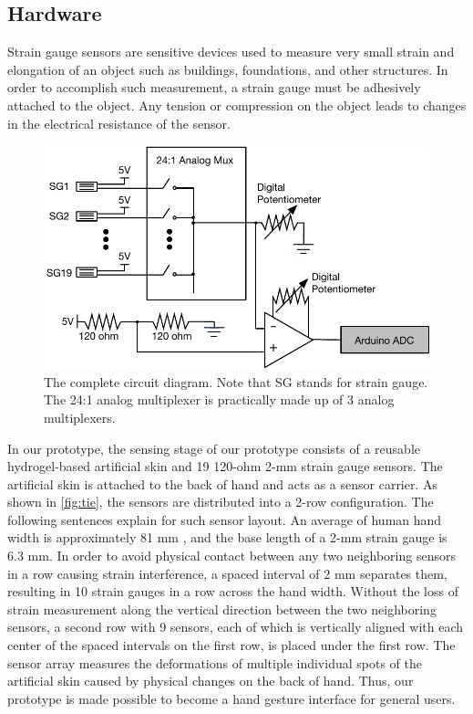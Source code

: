 \documentclass{sigchi}
\begin{document}
\subsection{Hardware} 
Strain gauge sensors are sensitive devices used to measure very small strain and elongation of an object such as buildings, foundations, and other structures. In order to accomplish such measurement, a strain gauge must be adhesively attached to the object. Any tension or compression on the object leads to changes in the electrical resistance of the sensor.

\begin{figure}[t]
  \includegraphics[width=1\columnwidth]{figures/CompleteDiagram_v2.pdf}
  \caption{The complete circuit diagram. Note that SG stands for strain gauge. The 24:1 analog multiplexer is practically made up of 3 analog multiplexers.}
  \label{fig:completeCircuitDiagram}
\end{figure}

In our prototype, the sensing stage of our prototype consists of a reusable hydrogel-based artificial skin and 19 120-ohm 2-mm strain gauge sensors. The artificial skin is attached to the back of hand and acts as a sensor carrier. As shown in \autoref{fig:tie}, the sensors are distributed into a 2-row configuration. The following sentences explain for such sensor layout. An average of human hand width is approximately 81 mm \cite{Kulaksiz2002257}, and the base length of a 2-mm strain gauge is 6.3 mm. In order to avoid physical contact between any two neighboring sensors in a row causing strain interference, a spaced interval of 2 mm separates them, resulting in 10 strain gauges in a row across the hand width. Without the loss of strain measurement along the vertical direction between the two neighboring sensors, a second row with 9 sensors, each of which is vertically aligned with each center of the spaced intervals on the first row, is placed under the first row. The sensor array measures the deformations of multiple individual spots of the artificial skin caused by physical changes on the back of hand. Thus, our prototype is made possible to become a hand gesture interface for general users.
\end{document}
